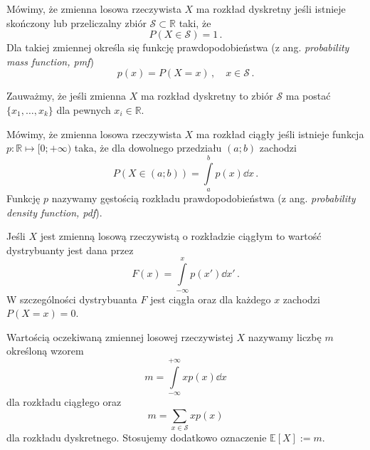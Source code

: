 \documentclass{myclass}
\numberwithin{equation}{section}
\begin{document}
\begin{definition}
Mówimy, że zmienna losowa rzeczywista \(X\) ma rozkład dyskretny jeśli istnieje skończony lub
przeliczalny zbiór \(\mathcal{S} \subset \mathbb{R}\) taki, że
\begin{equation*}
    P( X \in \mathcal{S} ) = 1\,.
\end{equation*}
Dla takiej zmiennej określa się funkcję prawdopodobieństwa (z ang. \textit{probability mass
function, pmf})
\begin{equation*}
    p(x) = P(X = x)\,,\quad x \in \mathcal{S}\,.
\end{equation*}
\end{definition}

Zauważmy, że jeśli zmienna \(X\) ma rozkład dyskretny to zbiór \(\mathcal{S}\) ma postać
\(\{x_1,\ldots,x_k\}\) dla pewnych \(x_i \in \mathbb{R}\).

\begin{definition}
Mówimy, że zmienna losowa rzeczywista \(X\) ma rozkład ciągły jeśli istnieje funkcja \(p: \mathbb{R}
\mapsto [0; +\infty)\) taka, że dla dowolnego przedziału \((a;b)\) zachodzi
\begin{equation*}
    P(X \in (a;b)) = \int\limits_a^b p(x) \dd{x}\,.
\end{equation*}
Funkcję \(p\) nazywamy gęstością rozkładu prawdopodobieństwa (z ang. \textit{probability density
function, pdf}).
\end{definition}

Jeśli \(X\) jest zmienną losową rzeczywistą o rozkładzie ciągłym to wartość dystrybuanty jest dana
przez
\begin{equation}
    F(x) = \int\limits_{-\infty}^x p(x') \dd{x'}\,.
\end{equation}
W szczególności dystrybuanta \(F\) jest ciągła oraz dla każdego \(x\) zachodzi \(P(X = x) = 0\).

\begin{definition}
Wartością oczekiwaną zmiennej losowej rzeczywistej \(X\) nazywamy liczbę \(m\) określoną wzorem
\begin{equation*}
    m = \int\limits_{-\infty}^{+\infty} x p(x) \dd{x}
\end{equation*}
dla rozkładu ciągłego oraz
\begin{equation*}
    m = \sum_{x \in \mathcal{S}} x p(x)
\end{equation*}
dla rozkładu dyskretnego. Stosujemy dodatkowo oznaczenie \(\mathbb{E}[X] := m\).
\end{definition}
\end{document}
